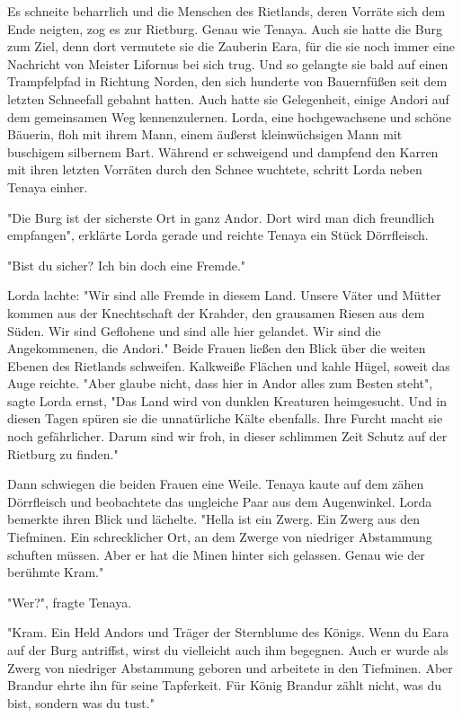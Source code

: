 \documentclass[10pt, a4paper, oneside]{book}
\begin{document}
\begin{multicols}{2}
Es schneite beharrlich und die Menschen des Rietlands, deren Vorräte sich dem Ende neigten, zog es zur Rietburg. Genau wie Tenaya. Auch sie hatte die Burg zum Ziel, denn dort vermutete sie die Zauberin Eara, für die sie noch immer eine Nachricht von Meister Lifornus bei sich trug. Und so gelangte sie bald auf einen Trampfelpfad in Richtung Norden, den sich hunderte von Bauernfüßen seit dem letzten Schneefall gebahnt hatten. Auch hatte sie Gelegenheit, einige Andori auf dem gemeinsamen Weg kennenzulernen. Lorda, eine hochgewachsene und schöne Bäuerin, floh mit ihrem Mann, einem äußerst kleinwüchsigen Mann mit buschigem silbernem Bart. Während er schweigend und dampfend den Karren mit ihren letzten Vorräten durch den Schnee wuchtete, schritt Lorda neben Tenaya einher. 

"Die Burg ist der sicherste Ort in ganz Andor. Dort wird man dich freundlich empfangen", erklärte Lorda gerade und reichte Tenaya ein Stück Dörrfleisch. 

"Bist du sicher? Ich bin doch eine Fremde."

Lorda lachte: "Wir sind alle Fremde in diesem Land. Unsere Väter und Mütter kommen aus der Knechtschaft der Krahder, den grausamen Riesen aus dem Süden. Wir sind Geflohene und sind alle hier gelandet. Wir sind die Angekommenen, die Andori." Beide Frauen ließen den Blick über die weiten Ebenen des Rietlands schweifen. Kalkweiße Flächen und kahle Hügel, soweit das Auge reichte. "Aber glaube nicht, dass hier in Andor alles zum Besten steht", sagte Lorda ernst, "Das Land wird von dunklen Kreaturen heimgesucht. Und in diesen Tagen spüren sie die unnatürliche Kälte ebenfalls. Ihre Furcht macht sie noch gefährlicher. Darum sind wir froh, in dieser schlimmen Zeit Schutz auf der Rietburg zu finden." 

Dann schwiegen die beiden Frauen eine Weile. Tenaya kaute auf dem zähen Dörrfleisch und beobachtete das ungleiche Paar aus dem Augenwinkel. Lorda bemerkte ihren Blick und lächelte. "Hella ist ein Zwerg. Ein Zwerg aus den Tiefminen. Ein schrecklicher Ort, an dem Zwerge von niedriger Abstammung schuften müssen. Aber er hat die Minen hinter sich gelassen. Genau wie der berühmte Kram."

"Wer?", fragte Tenaya.

"Kram. Ein Held Andors und Träger der Sternblume des Königs. Wenn du Eara auf der Burg antriffst, wirst du vielleicht auch ihm begegnen. Auch er wurde als Zwerg von niedriger Abstammung geboren und arbeitete in den Tiefminen. Aber Brandur ehrte ihn für seine Tapferkeit. Für König Brandur zählt nicht, was du bist, sondern was du tust."


\end{multicols}
\end{document}
